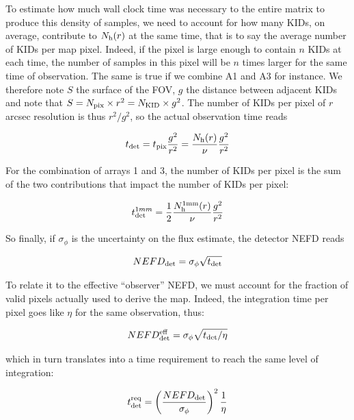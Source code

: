 To estimate how much wall clock time was necessary to the entire matrix to
produce this density of samples, we need to account for how many KIDs, on
average, contribute to $N_{\rm{h}}(r)$ at the same time, that is to say the average
number of KIDs per map pixel. Indeed, if the pixel is large enough to contain
$n$ KIDs at each time, the number of samples in this pixel will be $n$ times
larger for the same time of observation. The same is true if we combine A1 and
A3 for instance. We therefore note $S$ the surface of the FOV, $g$ the distance
between adjacent KIDs and note that $S = N_{\rm{pix}} \times r^2 = N_{\rm{KID}} \times
g^2$. The number of KIDs per pixel of $r$\,arcsec resolution is thus $r^2/g^2$,
so the actual observation time reads

\begin{equation}
t_{\rm{det}} = t_{\rm{pix}}\frac{g^2}{r^2} = \frac{N_{\rm{h}}(r)}{\nu}\frac{g^2}{r^2}
\end{equation}

For the combination of arrays 1 and 3, the number of KIDs per pixel is the sum
of the two contributions that impact the number of KIDs per pixel:

\begin{equation}
t_{\rm{det}}^{1mm} = \frac{1}{2}\frac{N^{1\rm{mm}}_{\rm{h}}(r)}{\nu}\frac{g^2}{r^2}
\end{equation}

So finally, if $\sigma_\phi$ is the uncertainty on the flux estimate, the detector NEFD reads

\begin{equation}
NEFD_{\rm{det}} = \sigma_\phi\sqrt{t_{\rm{det}}}
\label{eq:nefd_t_int}
\end{equation}

To relate it to the effective ``observer'' NEFD, we must account for the
fraction of valid pixels actually used to derive the map. Indeed, the
integration time per pixel goes like $\eta$ for the same observation, thus:

\begin{equation}
NEFD_{\rm{det}}^{\rm{eff}} = \sigma_\phi\sqrt{t_{\rm{det}}/\eta}
\end{equation}

which in turn translates into a time requirement to reach the same level of integration:

\begin{equation}
t_{\rm{det}}^{\rm{req}} = \left(\frac{NEFD_{\rm{det}}}{\sigma_\phi}\right)^2\frac{1}{\eta}
\label{eq:t_astro}
\end{equation}

